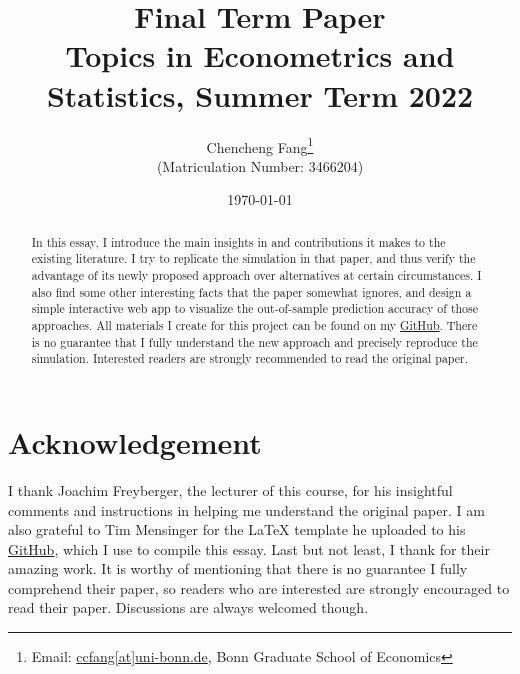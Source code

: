 \documentclass[a4paper, 12pt]{article}
\begin{document}
\begin{titlepage}
\title{\textbf{Final Term Paper} \\[1ex] \large Topics in Econometrics and Statistics, Summer Term 2022 }
\author{Chencheng Fang\thanks{Email: \href{mailto: ccfang@uni-bonn.de}{ccfang[at]uni-bonn.de}, Bonn Graduate School of Economics} \\ \small (Matriculation Number: 3466204)}
\date{\today}
\maketitle
\begin{abstract}
\onehalfspacing
\noindent In this essay, I introduce the main insights in \cite{Bauer2019} and contributions it makes to the existing literature. I try to replicate the simulation in that paper, and thus verify the advantage of its newly proposed approach over alternatives at certain circumstances. I also find some other interesting facts that the paper somewhat ignores, and design a simple interactive web app to visualize the out-of-sample prediction accuracy of those approaches. All materials I create for this project can be found on my \href{https://github.com/ccfang2/TopicsMetricsStats2022}{GitHub}. There is no guarantee that I fully understand the new approach and precisely reproduce the simulation. Interested readers are strongly recommended to read the original paper.\\


\bigskip
\end{abstract}
\setcounter{page}{0}
\thispagestyle{empty}
\end{titlepage}
\pagebreak \newpage




\doublespacing









\section*{Acknowledgement}
I thank Joachim Freyberger, the lecturer of this course, for his insightful comments and instructions in helping me understand the original paper. I am also grateful to Tim Mensinger for the LaTeX template he uploaded to his \href{https://github.com/timmens/topics-metrics-2021}{GitHub}, which I use to compile this essay. Last but not least, I thank \cite{Bauer2019} for their amazing work. It is worthy of mentioning that there is no guarantee I fully comprehend their paper, so readers who are interested are strongly encouraged to read their paper. Discussions are always welcomed though.
\end{document}
